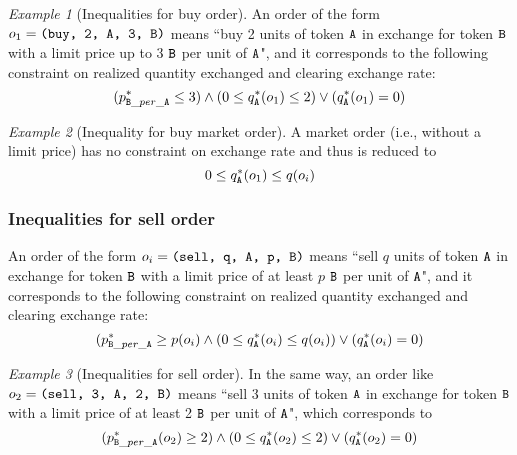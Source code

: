 \documentclass[11pt, reqno]{amsart}
\theoremstyle{definition}
\theoremstyle{remark}
\newtheorem{exmp}{Example}[subsection]
\newcommand{\tA}{\textnormal{\texttt{A}}}
\newcommand{\tB}{\textnormal{\texttt{B}}}
\newcommand{\buy}{\textnormal{\texttt{buy}}}
\newcommand{\sell}{\textnormal{\texttt{sell}}}
\begin{document}
\begin{exmp}[Inequalities for buy order]
An order of the form $o_1 = \texttt{(\buy, 2, \tA, 3, \tB)}$ means
``buy 2 units of token $\tA$ in exchange for token $\tB$ with a limit price up
to 3 $\tB$ per unit of $\tA$",
and it corresponds to the following constraint on realized quantity exchanged
and clearing exchange rate:
\begin{equation*}
    (p_{\tB\_per\_\tA}^* \leq 3) \land
    (0 \le q_\tA^*(o_1) \leq 2) \lor
    (q_\tA^*(o_1) = 0)
\end{equation*}
\end{exmp}

\begin{exmp}[Inequality for buy market order]
A market order (i.e., without a limit price) has no constraint on exchange rate
and thus is reduced to
\[
    0 \le q_\tA^*(o_1) \le q(o_i)
\]
\end{exmp}

\subsubsection{Inequalities for sell order}
An order of the form $o_i = \texttt{(\sell, q, \tA, p, \tB)}$ means
``sell $q$ units of token $\tA$ in exchange for token $\tB$ with a limit price
of at least $p$ $\tB$ per unit of $\tA$",
and it corresponds to the following constraint on realized quantity exchanged
and clearing exchange rate:
\begin{equation*}
	(p_{\tB\_per\_\tA}^* \geq p(o_i) \land
	(0 \le q_\tA^*(o_i) \leq q(o_i)) \lor
	(q_\tA^*(o_i) = 0)
\end{equation*}

\begin{exmp}[Inequalities for sell order]
In the same way, an order like $o_2 = \texttt{(sell, 3, \tA, 2, \tB)}$ means
``sell 3 units of token $\tA$ in exchange for token $\tB$ with a limit price of
at least 2 $\tB$ per unit of $\tA$", which corresponds to
\begin{equation*}
    (p_{\tB\_per\_\tA}^*(o_2) \geq 2) \land
    (0 \le q_\tA^*(o_2) \leq 2) \lor
    (q_\tA^*(o_2) = 0)
\end{equation*}
\end{exmp}
\end{document}

